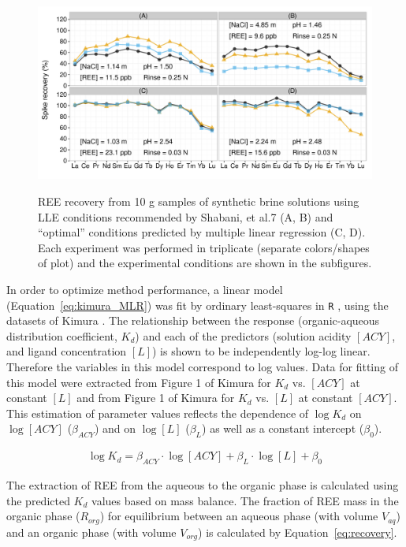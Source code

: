\begin{figure}[htbp]
\begin{center}
\includegraphics[width=\textwidth]{Ch4_figures/LLE-reproduction-recoveries.pdf}
\caption{REE recovery from 10 g samples of synthetic brine solutions using LLE conditions recommended by Shabani, et al.7 (A, B)
and ``optimal'' conditions predicted by multiple linear regression (C, D).
Each experiment was performed in triplicate (separate colors/shapes of plot) and the experimental conditions are shown in the subfigures.}\label{fig:reproduction}
\label{default}
\end{center}
\end{figure}

In order to optimize method performance, a linear model (Equation~\ref{eq:kimura_MLR}) was fit by ordinary least-squares in \texttt{R} \citep{R},
using the datasets of Kimura \citep{Kimura_BCSJ_1960, Kimura_BCSJ_1961}.
The relationship between the response (organic-aqueous distribution coefficient, $K_d$) and each of the predictors (solution acidity $[ACY]$, and ligand concentration $[L]$) is shown to be independently log-log linear.
Therefore the variables in this model correspond to log values. Data for fitting of this model were extracted from Figure 1 of Kimura \citep{Kimura_BCSJ_1960} for $K_d$ vs. $[ACY]$ at constant $[L]$ and from Figure 1 of Kimura \citep{Kimura_BCSJ_1961} for $K_d$ vs. $[L]$ at constant $[ACY]$. This estimation of parameter values reflects the dependence of $\log K_d$ on $\log[ACY]$ ($\beta_{ACY}$) and on $\log[L]$ ($\beta_L$) as well as a constant intercept ($\beta_0$).

\begin{align}\label{eq:kimura_MLR}
\log K_d = \beta_{ACY} \cdot \log[ACY] + \beta_L \cdot \log[L] + \beta_0
\end{align}

The extraction of REE from the aqueous to the organic phase is calculated using the predicted $K_d$ values based on mass balance.
The fraction of REE mass in the organic phase ($R_{org}$) for equilibrium between an aqueous phase (with volume $V_{aq}$) and an organic phase (with volume $V_{org}$) is calculated by Equation~\ref{eq:recovery}.

